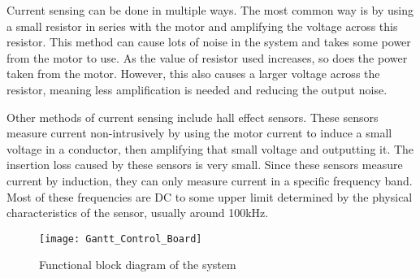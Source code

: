 \noindent Current sensing can be done in multiple ways. The most common way is by using a small resistor in series with the motor and amplifying the voltage across this resistor. This method can cause lots of noise in the system and takes some power from the motor to use. As the value of resistor used increases, so does the power taken from the motor. However, this also causes a larger voltage across the resistor, meaning less amplification is needed and reducing the output noise.

\noindent Other methods of current sensing include hall effect sensors. These sensors measure current non-intrusively by using the motor current to induce a small voltage in a conductor, then amplifying that small voltage and outputting it. The insertion loss caused by these sensors is very small. Since these sensors measure current by induction, they can only measure current in a specific frequency band. Most of these frequencies are DC to some upper limit determined by the physical characteristics of the sensor, usually around 100kHz.

\begin{figure}[H]
\centering
\texttt{[image: Gantt\_Control\_Board]}
\caption{Functional block diagram of the system}
\label{fig:Functional_Block_Diagram}
\end{figure}


